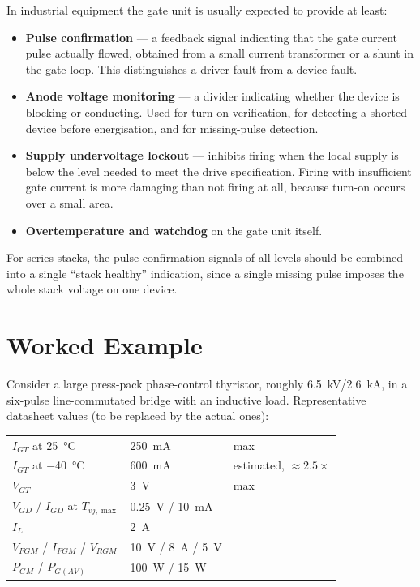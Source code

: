In industrial equipment the gate unit is usually expected to provide at least:

\begin{itemize}
  \item \textbf{Pulse confirmation} --- a feedback signal indicating that the gate
        current pulse actually flowed, obtained from a small current transformer or
        a shunt in the gate loop. This distinguishes a driver fault from a device
        fault.
  \item \textbf{Anode voltage monitoring} --- a divider indicating whether the
        device is blocking or conducting. Used for turn-on verification, for
        detecting a shorted device before energisation, and for missing-pulse
        detection.
  \item \textbf{Supply undervoltage lockout} --- inhibits firing when the local
        supply is below the level needed to meet the drive specification. Firing
        with insufficient gate current is more damaging than not firing at all,
        because turn-on occurs over a small area.
  \item \textbf{Overtemperature and watchdog} on the gate unit itself.
\end{itemize}

For series stacks, the pulse confirmation signals of all levels should be combined
into a single ``stack healthy'' indication, since a single missing pulse imposes
the whole stack voltage on one device.

\section{Worked Example}

Consider a large press-pack phase-control thyristor, roughly
\SI{6.5}{\kilo\volt}/\SI{2.6}{\kilo\ampere}, in a six-pulse line-commutated bridge
with an inductive load. Representative datasheet values (to be replaced by the
actual ones):

\begin{center}
\begin{tabular}{@{}lll@{}}
\toprule
$I_{GT}$ at \SI{25}{\celsius} & \SI{250}{\milli\ampere} & max \\
$I_{GT}$ at \SI{-40}{\celsius} & \SI{600}{\milli\ampere} & estimated, $\approx 2.5\times$ \\
$V_{GT}$ & \SI{3}{\volt} & max \\
$V_{GD}$ / $I_{GD}$ at $T_{vj,\max}$ & \SI{0.25}{\volt} / \SI{10}{\milli\ampere} & \\
$I_L$ & \SI{2}{\ampere} & \\
$V_{FGM}$ / $I_{FGM}$ / $V_{RGM}$ & \SI{10}{\volt} / \SI{8}{\ampere} / \SI{5}{\volt} & \\
$P_{GM}$ / $P_{G(AV)}$ & \SI{100}{\watt} / \SI{15}{\watt} & \\
\bottomrule
\end{tabular}
\end{center}

